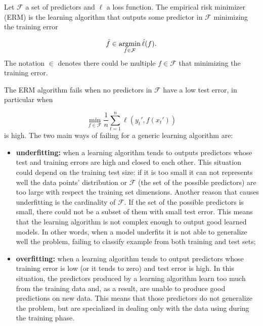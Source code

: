 \begin{definition} 
	Let $\mathcal{F}$ a set of predictors and $\ell$ a loss function. The empirical risk minimizer (ERM) is the learning algorithm that outputs some predictor in $\mathcal{F}$ minimizing the training error
	
	\begin{equation}
	\hat f \in \operatorname*{argmin}_{f \in \mathcal{F}} \hat \ell(f).
	\end{equation}
	The notation $\in$ denotes there could be multiple $f \in \mathcal{F}$ that minimizing the training error.
\end{definition}

The ERM algorithm fails when no predictors in $\mathcal{F}$ have a low test error, in particular when 

\begin{equation}
	\min_{f \in \mathcal{F}} \frac{1}{n} \sum_{t = 1}^{n} \ell(y_t', f(x_t'))
\end{equation} 
is high. The two main ways of failing for a generic learning algorithm are:
\begin{itemize}
	\item \textbf{underfitting:} when a learning algorithm tends to outputs predictors whose test and training errors are high and closed to each other. This situation could depend on the training test size: if it is too small it can not represents well the data points' distribution or $\mathcal{F}$ (the set of the possible predictors) are too large with respect the training set dimensions. Another reason that causes underfitting is the cardinality of $\mathcal{F}$. If the set of the possible predictors is small, there could not be a subset of them with small test error. This means that the learning algorithm is not complex enough to output good learned models. In other words, when a model underfits it is not able to generalize well the problem, failing to classify example from both training and test sets;
	\item \textbf{overfitting:} when a learning algorithm tends to output predictors whose training error is low (or it tends to zero) and test error is high. In this situation, the predictors produced by a learning algorithm learn too much from the training data and, as a result, are unable to produce good predictions on new data. This means that those predictors do not generalize the problem, but are specialized in dealing only with the data using during the training phase.
\end{itemize}

